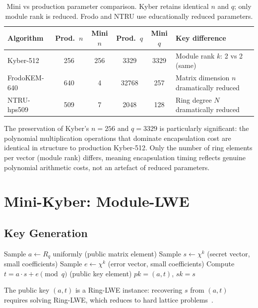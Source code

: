 \documentclass[12pt,a4paper]{report}
\begin{document}
\begin{table}[H]
\centering
\caption{Mini vs production parameter comparison. Kyber retains identical $n$ and $q$;
only module rank is reduced. Frodo and NTRU use educationally reduced parameters.}
\label{tab:params}
\begin{tabular}{l|c|c|c|c|l}
\toprule
\textbf{Algorithm} & \textbf{Prod.\ $n$} & \textbf{Mini $n$}
& \textbf{Prod.\ $q$} & \textbf{Mini $q$} & \textbf{Key difference} \\
\midrule
Kyber-512 & 256 & 256 & 3329 & 3329 & Module rank $k$: 2 vs 2 (same) \\
FrodoKEM-640 & 640 & 4 & 32768 & 257 & Matrix dimension $n$ dramatically reduced \\
NTRU-hps509 & 509 & 7 & 2048 & 128 & Ring degree $N$ dramatically reduced \\
\bottomrule
\end{tabular}
\end{table}

The preservation of Kyber's $n=256$ and $q=3329$ is particularly significant: the
polynomial multiplication operations that dominate encapsulation cost are identical in
structure to production Kyber-512. Only the number of ring elements per vector (module
rank) differs, meaning encapsulation timing reflects genuine polynomial arithmetic
costs, not an artefact of reduced parameters.

\section{Mini-Kyber: Module-LWE}

\subsection{Key Generation}

\begin{algorithm}[H]
\caption{Mini-Kyber Key Generation}
\label{alg:kyber-keygen}
\begin{algorithmic}[1]
\State Sample $a \leftarrow R_q$ uniformly (public matrix element)
\State Sample $s \leftarrow \chi^k$ (secret vector, small coefficients)
\State Sample $e \leftarrow \chi^k$ (error vector, small coefficients)
\State Compute $t = a \cdot s + e \pmod{q}$ (public key element)
\State \Return $pk = (a, t)$, $sk = s$
\end{algorithmic}
\end{algorithm}

The public key $(a, t)$ is a Ring-LWE instance: recovering $s$ from $(a, t)$ requires
solving Ring-LWE, which reduces to hard lattice problems~\cite{lyubashevsky2010}.
\end{document}

